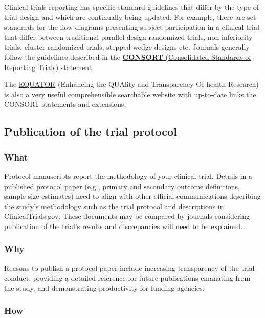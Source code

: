 \documentclass[]{book}
\begin{document}
Clinical trials reporting has specific standard guidelines that differ
by the type of trial design and which are continually being updated. For
example, there are set standards for the flow diagrams presenting
subject participation in a clinical trial that differ between
traditional parallel design randomized trials, non-inferiority trials,
cluster randomized trials, stepped wedge designs etc. Journals generally
follow the guidelines described in the
\href{http://www.consort-statement.org/}{\textbf{CONSORT} (Consolidated
Standards of Reporting Trials) statement}.

The \href{http://www.equator-network.org/}{EQUATOR} (Enhancing the
QUAlity and Transparency Of health Research) is also a very useful
comprehensible searchable website with up-to-date links the CONSORT
statements and extensions.

\subsection{Publication of the trial
protocol}\label{publication-of-the-trial-protocol}

\subsubsection{What}\label{what-20}

Protocol manuscripts report the methodology of your clinical trial.
Details in a published protocol paper (e.g., primary and secondary
outcome definitions, sample size estimates) need to align with other
official communications describing the study's methodology such as the
trial protocol and descriptions in ClinicalTrials.gov. These documents
may be compared by journals considering publication of the trial's
results and discrepancies will need to be explained.

\subsubsection{Why}\label{why-20}

Reasons to publish a protocol paper include increasing transparency of
the trial conduct, providing a detailed reference for future
publications emanating from the study, and demonstrating productivity
for funding agencies.

\subsubsection{How}\label{how-20}
\end{document}
